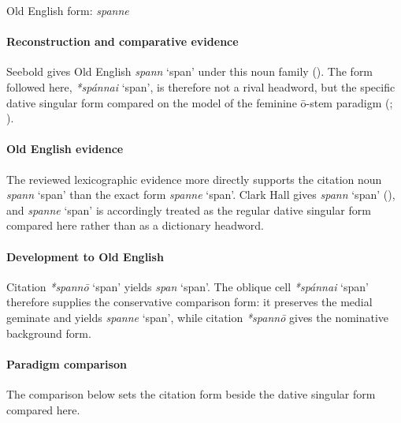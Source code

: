 \documentclass[
  british,
  a4paper,
]{article}
\providecommand{\Recon}[1]{\emph{*#1}}
\begin{document}
Old English form: \emph{spanne}

\paragraph{Reconstruction and comparative
evidence}\label{reconstruction-and-comparative-evidence-145}

Seebold gives Old English {\emph{spann}} `span' under this noun family
(). The form followed here,
\Recon{spánnai} `span', is therefore not a rival headword, but the
specific dative singular form compared on the model of the feminine
ō-stem paradigm (; ).

\paragraph{Old English evidence}\label{old-english-evidence-147}

The reviewed lexicographic evidence more directly supports the citation
noun {\emph{spann}} `span' than the exact form {\emph{spanne}} `span'.
Clark Hall gives {\emph{spann}} `span'
(), and
{\emph{spanne}} `span' is accordingly treated as the regular dative
singular form compared here rather than as a dictionary headword.

\paragraph{Development to Old
English}\label{development-to-old-english-146}

Citation \Recon{spannō} `span' yields {\emph{span}} `span'. The oblique
cell \Recon{spánnai} `span' therefore supplies the conservative
comparison form: it preserves the medial geminate and yields
{\emph{spanne}} `span', while citation \Recon{spannō} gives the
nominative background form.

\paragraph{Paradigm comparison}\label{paradigm-comparison-22}

The comparison below sets the citation form beside the dative singular
form compared here.
\end{document}
